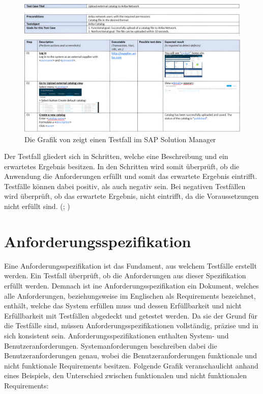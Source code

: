 \documentclass[12pt,toc=bib,toc=listof]{scrreprt}
\begin{document}
\begin{figure} [H]
    \centering
    \includegraphics[width=1\linewidth]{./Bilder/Enderli_Testfall im SAP Solution Manager.jpeg}
    \caption{Die Grafik von \textcite{Enderli2019} zeigt einen Testfall im SAP Solution Manager}
    \label{fig:enter-label}
\end{figure}
\noindent Der Testfall gliedert sich in Schritten, welche eine Beschreibung und ein erwartetes Ergebnis besitzen. In den Schritten wird somit überprüft, ob die Anwendung die Anforderungen erfüllt und somit das erwartete Ergebnis eintrifft. Testfälle können dabei positiv, als auch negativ sein. Bei negativen Testfällen wird überprüft, ob das erwartete Ergebnis, nicht eintrifft, da die Voraussetzungen nicht erfüllt sind. (\cite{IsoIecIeee2024}; \cite{Istqb2017})
\newpage

\section{Anforderungsspezifikation} %
\label{sec:anforderungsspezifikation}
Eine Anforderungsspezifikation  ist das Fundament, aus welchem Testfälle erstellt werden. Ein Testfall überprüft, ob die Anforderungen aus dieser Spezifikation erfüllt werden. Demnach ist ine Anforderungsspezifikation ein Dokument, welches alle Anforderungen, beziehungsweise im Englischen als Requirements bezeichnet, enthält, welche das System erfüllen muss und dessen Erfüllbarkeit und nicht Erfüllbarkeit mit Testfällen abgedeckt und getestet werden. Da sie der Grund für die Testfälle sind, müssen Anforderungsspezifikationen vollständig, präzise und in sich konsistent sein. Anforderungsspezifikationen enthalten System- und Benutzeranforderungen. Systemanforderungen beschreiben dabei die Benutzeranforderungen genau, wobei die Benutzeranforderungen funktionale und nicht funktionale Requirements besitzen. Folgende Grafik veranschaulicht anhand eines Beispiels, den Unterschied zwischen funktionalen und nicht funktionalen Requirements:
\end{document}
